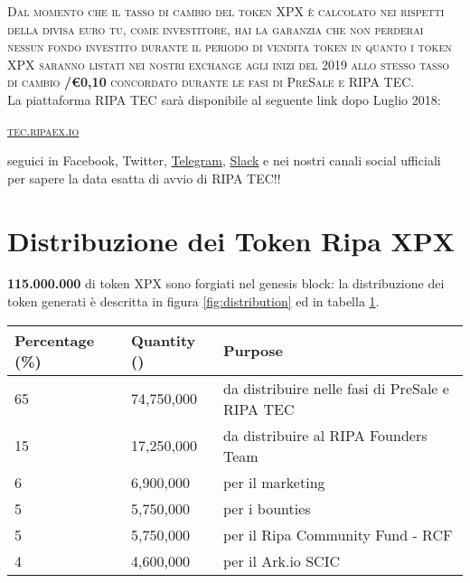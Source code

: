 \documentclass[11pt,fleqn]{book} %
\begin{document}
\textsc{Dal momento che il tasso di cambio del token XPX è calcolato nei rispetti della divisa euro tu, come investitore,
hai la garanzia che non perderai nessun fondo investito durante il periodo di vendita token in quanto i token XPX
saranno listati nei nostri exchange agli inizi del 2019 allo stesso tasso di cambio \textbf{\PHP/\euro0,10} 
concordato durante le fasi di PreSale e RIPA TEC}.\\

La piattaforma RIPA TEC sarà disponibile al seguente link dopo Luglio 2018:
\begin{center}
	\href{https://tec.ripaex.io}{\textsc{tec.ripaex.io}}
\end{center}
seguici in Facebook, Twitter, 
\href{https://t.me/ripaex}{Telegram}, 
\href{https://join.slack.com/t/ripaex/shared_invite/enQtMzM4NzUwNjU4OTQ0LTY3MDJmMTdhYTNlZjJlNGUxNzM1YjUwYjgyYjZlMDJmOTg3NTIzNThmNTYyMGQ3ODBkOTRmYzk3Y2Y4MzBkOTY}{Slack}
e nei nostri canali social ufficiali per sapere la data esatta di avvio di
RIPA TEC!!

\section{Distribuzione dei Token Ripa XPX}
\textbf{115.000.000} di token XPX sono forgiati nel genesis block: la distribuzione dei token generati è descritta
in figura \ref{fig:distribution} ed in tabella \ref{tab:distribution}.

\vspace{5mm}
	\label{fig:distribution}

\vspace{5mm}
\begin{table}[H]
	\centering
	\begin{tabular}{l l l}
		\toprule
		\textbf{Percentage (\%)} & \textbf{Quantity (\PHP)} & \textbf{Purpose} \\
		\midrule
		65		& 74,750,000	& da distribuire nelle fasi di PreSale e RIPA TEC	\\
		15      & 17,250,000	& da distribuire al RIPA Founders Team	\\
		6       & 6,900,000		& per il marketing	\\
		5       & 5,750,000 	& per i bounties	\\
		5       & 5,750,000		& per il Ripa Community Fund - RCF	\\
		4       & 4,600,000		& per il Ark.io SCIC \\
		\bottomrule
	\end{tabular}
	\label{tab:distribution}
\end{table}
\end{document}
